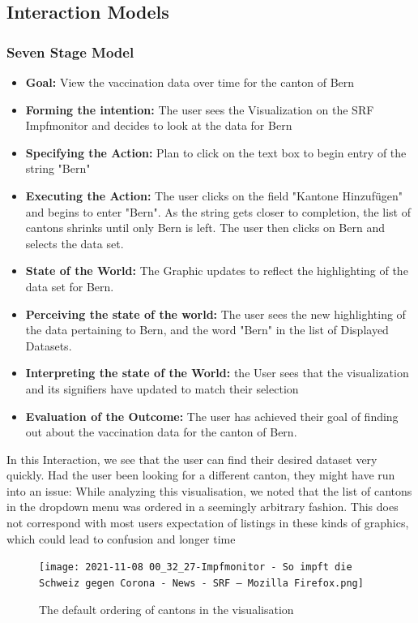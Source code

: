 \documentclass[12pt, letterpaper]{article}
\begin{document}
\subsection{Interaction Models}
\subsubsection{Seven Stage Model}
\begin{itemize}
    \item \textbf{Goal: } View the vaccination data over time for the canton of Bern 
    \item \textbf{Forming the intention: } The user sees the Visualization on the SRF Impfmonitor and decides to look at the data for Bern 
    \item \textbf{Specifying the Action: }Plan to click on the text box to begin entry of the string "Bern" 
    \item\textbf{Executing the Action: }The user clicks on the field "Kantone Hinzufügen" and begins to enter "Bern". As the string gets closer to completion, the list of cantons shrinks until only Bern is left. The user then clicks on Bern and selects the data set. 
    \item \textbf{State of the World: } The Graphic updates to reflect the highlighting of the data set for Bern. 
    \item \textbf{Perceiving the state of the world: }The user sees the new highlighting of the data pertaining to Bern, and the word "Bern" in the list of Displayed Datasets.
\item \textbf{Interpreting the state of the World: } the User sees that the visualization and its signifiers have updated to match their selection
\item \textbf{Evaluation of the Outcome: } The user has achieved their goal of finding out about the vaccination data for the canton of Bern. 
\end{itemize}
In this Interaction, we see that the user can find their desired dataset very quickly. Had the user been looking for a different canton, they might have run into an issue: While analyzing this visualisation, we noted that the list of cantons in the dropdown menu was ordered in a seemingly arbitrary fashion. This does not correspond with most users expectation of listings in these kinds of graphics, which could lead to confusion and longer time
\begin{figure}[h]
    \centering
    \texttt{[image: 2021-11-08 00\_32\_27-Impfmonitor - So impft die Schweiz gegen Corona - News - SRF — Mozilla Firefox.png]}
    \caption{The default ordering of cantons in the visualisation}
    \label{fig:my_label}
\end{figure}
\newpage
\end{document}
